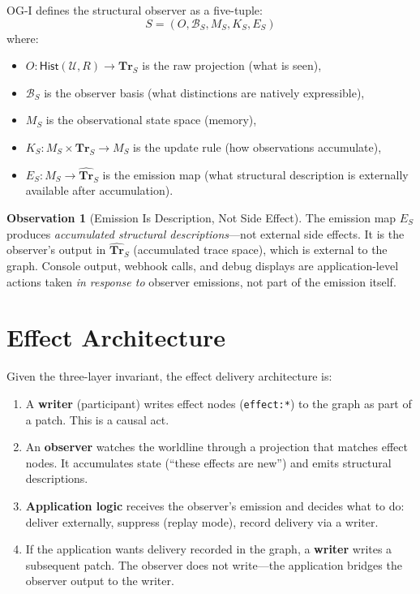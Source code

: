 \documentclass[11pt]{article}
\newcommand{\Hist}{\mathsf{Hist}}
\newcommand{\Tr}{\mathbf{Tr}}
\theoremstyle{definition}
\newtheorem{observation}{Observation}
\begin{document}
OG-I defines the structural observer as a five-tuple:
\[
S = (O, \mathcal{B}_S, M_S, K_S, E_S)
\]
where:
\begin{itemize}[leftmargin=2em]
\item $O : \Hist(\mathcal{U}, R) \to \Tr_S$ is the raw projection
  (what is seen),
\item $\mathcal{B}_S$ is the observer basis (what distinctions are
  natively expressible),
\item $M_S$ is the observational state space (memory),
\item $K_S : M_S \times \Tr_S \to M_S$ is the update rule (how
  observations accumulate),
\item $E_S : M_S \to \widehat{\Tr}_S$ is the emission map (what
  structural description is externally available after accumulation).
\end{itemize}

\begin{observation}[Emission Is Description, Not Side Effect]
The emission map $E_S$ produces \emph{accumulated structural
descriptions}---not external side effects. It is the observer's
output in $\widehat{\Tr}_S$ (accumulated trace space), which is
external to the graph. Console output, webhook calls, and debug
displays are application-level actions taken \emph{in response to}
observer emissions, not part of the emission itself.
\end{observation}

\section{Effect Architecture}

Given the three-layer invariant, the effect delivery architecture is:

\begin{enumerate}[leftmargin=2em]
\item A \textbf{writer} (participant) writes effect nodes
  (\texttt{effect:*}) to the graph as part of a patch. This is a
  causal act.
\item An \textbf{observer} watches the worldline through a projection
  that matches effect nodes. It accumulates state
  (``these effects are new'') and emits structural descriptions.
\item \textbf{Application logic} receives the observer's emission and
  decides what to do: deliver externally, suppress (replay mode),
  record delivery via a writer.
\item If the application wants delivery recorded in the graph, a
  \textbf{writer} writes a subsequent patch. The observer does not
  write---the application bridges the observer output to the writer.
\end{enumerate}
\end{document}
